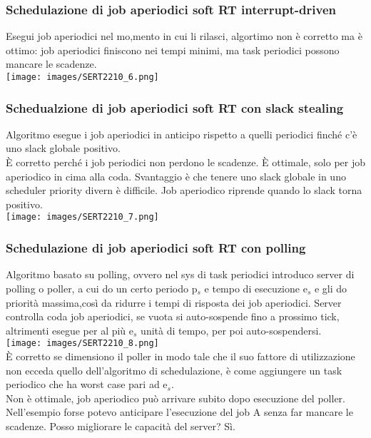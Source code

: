 \documentclass[18px]{article}
\begin{document}
\subsubsection{Schedulazione di job aperiodici soft RT interrupt-driven}
Esegui job aperiodici nel mo,mento in cui li rilasci, algortimo non è corretto ma è ottimo: job aperiodici finiscono nei tempi minimi, ma task periodici possono mancare le scadenze.\\
\texttt{[image: images/SERT2210\_6.png]}\\
\subsubsection{Schedualzione di job aperiodici soft RT con slack stealing}
Algoritmo esegue i job aperiodici in anticipo rispetto a quelli periodici finché c'è uno slack globale positivo.\\ È corretto perché i job periodici non perdono le scadenze. È ottimale, solo per job aperiodico in cima alla coda. Svantaggio è che tenere uno slack globale in uno scheduler priority divern è difficile.
Job aperiodico riprende quando lo slack torna positivo.\\
\texttt{[image: images/SERT2210\_7.png]}\\
\subsubsection{Schedulazione di job aperiodici soft RT con polling}
Algoritmo basato su polling, ovvero nel sys di task periodici introduco server di polling o poller, a cui do un certo periodo p$_{s}$ e tempo di esecuzione e$_{s}$ e gli do priorità massima,così da ridurre i tempi di risposta dei job aperiodici. Server controlla coda job aperiodici, se vuota si auto-sospende fino a prossimo tick, altrimenti esegue per al più
e$_{s}$ unità di tempo, per poi auto-sospendersi.\\ 
\texttt{[image: images/SERT2210\_8.png]}\\
È corretto se dimensiono il poller in modo tale che il suo fattore di utilizzazione non ecceda quello dell'algoritmo di schedulazione, è come aggiungere un task periodico che ha worst case pari ad e$_{s}$. \\ Non è ottimale, job aperiodico può arrivare subito dopo esecuzione del poller. Nell'esempio forse potevo anticipare l'esecuzione del job A senza far mancare le scadenze. Posso migliorare le capacità del server? Sì.
\end{document}
